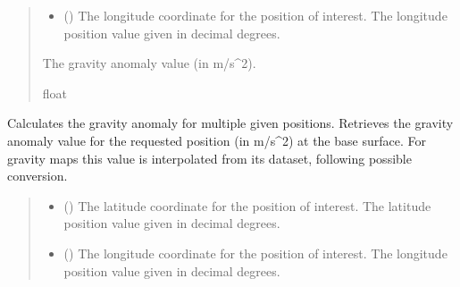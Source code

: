 \documentclass[letterpaper,10pt,english]{sphinxmanual}
\begin{document}
\begin{fulllineitems}
\begin{fulllineitems}
\begin{quote}
\begin{description}
\begin{itemize}
\item {} 
\sphinxAtStartPar
{} () \textendash{} The longitude coordinate for the position of interest.
The longitude position value given in decimal degrees.

\end{itemize}

\sphinxAtStartPar
The gravity anomaly value (in m/s\textasciicircum{}2).

\sphinxAtStartPar
float

\end{description}\end{quote}

\end{fulllineitems}


\begin{fulllineitems}
\label{\detokenize{modules/gravity/ggm_plus:qnav.gravity.ggm_plus.GGMPlusAcc.get_anomaly_vec}}
\pysigstartsignatures
{}
\pysigstopsignatures
\sphinxAtStartPar
Calculates the gravity anomaly for multiple given positions.
Retrieves the gravity anomaly value for the requested position
(in m/s\textasciicircum{}2) at the base surface. For gravity maps this value is
interpolated from its dataset, following possible conversion.
\begin{quote}\begin{description}
\begin{itemize}
\item {} 
\sphinxAtStartPar
{} () \textendash{} The latitude coordinate for the position of interest.
The latitude position value given in decimal degrees.

\item {} 
\sphinxAtStartPar
{} () \textendash{} The longitude coordinate for the position of interest.
The longitude position value given in decimal degrees.


\end{itemize}
\end{description}
\end{quote}
\end{fulllineitems}
\end{fulllineitems}
\end{document}
